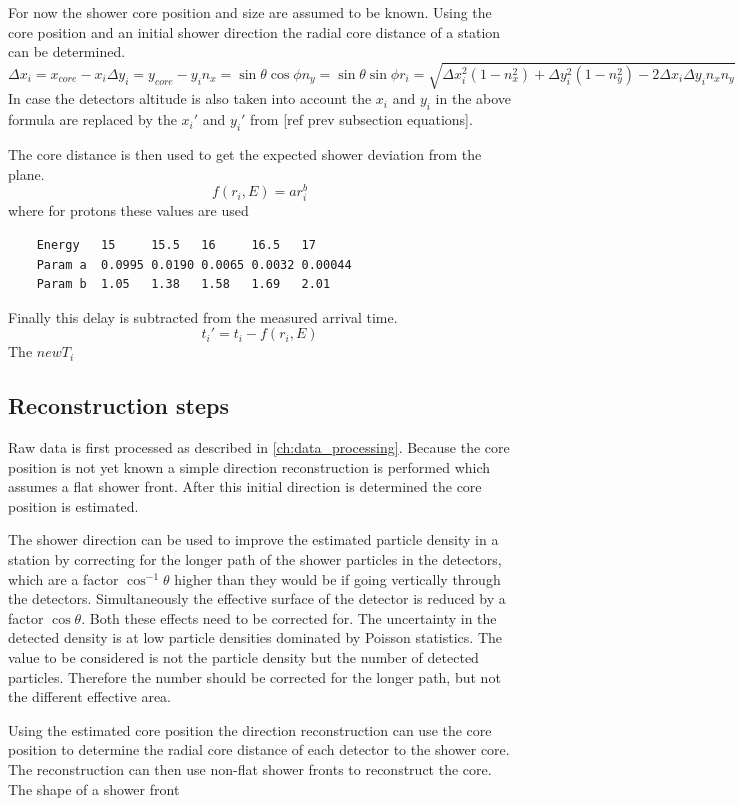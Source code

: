 For now the shower core position and size are assumed to be known. Using the core position and an initial shower direction the radial core distance of a station can be determined.
%
\begin{equation}
    \Delta x_i = x_{core} - x_i
    \Delta y_i = y_{core} - y_i
    n_x = \sin \theta \cos \phi
    n_y = \sin \theta \sin \phi
    r_i = \sqrt{\Delta x_i^2 (1 - n_x^2) + \Delta y_i^2 (1 - n_y^2) -
                2 \Delta x_i \Delta y_i n_x n_y}
\end{equation}
%
In case the detectors altitude is also taken into account the $x_i$ and $y_i$ in the above formula are replaced by the $x_i'$ and $y_i'$ from [ref prev subsection equations].

The core distance is then used to get the expected shower deviation from the plane.
%
\begin{equation}
    f(r_i, E) = a r_i^b
\end{equation}
%
where for protons these values are used
%
\begin{verbatim}
    Energy   15     15.5   16     16.5   17
    Param a  0.0995 0.0190 0.0065 0.0032 0.00044
    Param b  1.05   1.38   1.58   1.69   2.01
\end{verbatim}
%
Finally this delay is subtracted from the measured arrival time.
%
\begin{equation}
    t_i' = t_i - f(r_i, E)
\end{equation}
%
The $ new T_i$

\subsection{Reconstruction steps}

Raw data is first processed as described in \cref{ch:data_processing}. Because the core position is not yet known a simple direction reconstruction is performed which assumes a flat shower front. After this initial direction is determined the core position is estimated.

The shower direction can be used to improve the estimated particle density in a station by correcting for the longer path of the shower particles in the detectors, which are a factor $\cos^{-1} \theta$ higher than they would be if going vertically through the detectors. Simultaneously the effective surface of the detector is reduced by a factor $\cos \theta$. Both these effects need to be corrected for. The uncertainty in the detected density is at low particle densities dominated by Poisson statistics. The value to be considered is not the particle density but the number of detected particles. Therefore the number should be corrected for the longer path, but not the different effective area.

Using the estimated core position the direction reconstruction can use the core position to determine the radial core distance of each detector to the shower core. The reconstruction can then use non-flat shower fronts to reconstruct the core. The shape of a shower front

